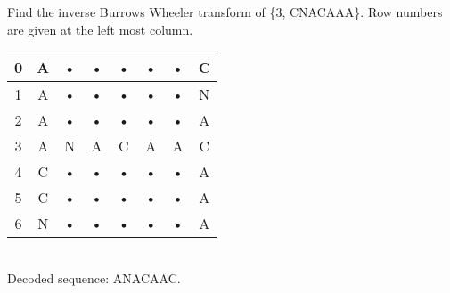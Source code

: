 \begin{question}
Find the inverse Burrows Wheeler transform of \{3, CNACAAA\}. Row numbers are given
at the left most column.
\end{question}
\begin{solution}
\begin{tabular}{|c|c|c|c|c|c|c|c|}
\hline 
0 & A & • & • & • & • & • & C \\ 
\hline 
1 & A & • & • & • & • & • & N \\ 
\hline 
2 & A & • & • & • & • & • & A \\ 
\hline 
3 & A & N & A & C & A & A & C \\ 
\hline 
4 & C & • & • & • & • & • & A \\ 
\hline 
5 & C & • & • & • & • & • & A \\ 
\hline 
6 & N & • & • & • & • & • & A \\ 
\hline 
\end{tabular} \\
Decoded sequence: ANACAAC. 
\end{solution}

